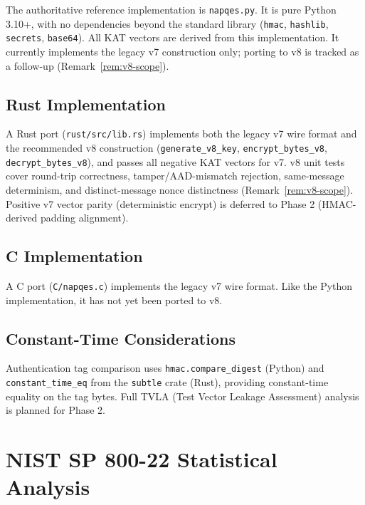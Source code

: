 \documentclass[11pt,a4paper]{article}
\begin{document}
The authoritative reference implementation is \texttt{napqes.py}.  It is
pure Python 3.10+, with no dependencies beyond the standard library
(\texttt{hmac}, \texttt{hashlib}, \texttt{secrets}, \texttt{base64}).  All
KAT vectors are derived from this implementation. It currently implements
the legacy v7 construction only; porting to v8 is tracked as a follow-up
(Remark~\ref{rem:v8-scope}).

\subsection{Rust Implementation}

A Rust port (\texttt{rust/src/lib.rs}) implements both the legacy v7 wire
format and the recommended v8 construction
(\texttt{generate\_v8\_key}, \texttt{encrypt\_bytes\_v8},
\texttt{decrypt\_bytes\_v8}), and passes all negative KAT vectors for v7.
v8 unit tests cover round-trip correctness, tamper/AAD-mismatch rejection,
same-message determinism, and distinct-message nonce distinctness
(Remark~\ref{rem:v8-scope}). Positive v7 vector parity (deterministic
encrypt) is deferred to Phase 2 (HMAC-derived padding alignment).

\subsection{C Implementation}

A C port (\texttt{C/napqes.c}) implements the legacy v7 wire format. Like
the Python implementation, it has not yet been ported to v8.

\subsection{Constant-Time Considerations}

Authentication tag comparison uses \texttt{hmac.compare\_digest} (Python) and
\texttt{constant\_time\_eq} from the \texttt{subtle} crate (Rust), providing
constant-time equality on the tag bytes.  Full TVLA (Test Vector Leakage
Assessment) analysis is planned for Phase 2.

\section{NIST SP 800-22 Statistical Analysis}
\label{sec:sts}
\end{document}
